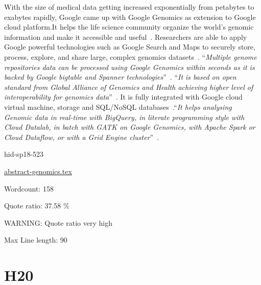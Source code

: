 With the size of medical data getting increased exponentially from 
petabytes to exabytes rapidly, Google came up with Google Genomics 
as extension to Google cloud platform.It helps the life science 
community organize the world’s genomic information and make it 
accessible and useful~\cite{hid-sp18-523-www-genomics}. 
Researchers are able to apply Google powerful technologies such as 
Google Search and Maps to securely store, process, explore, and share 
large, complex genomics datasets~\cite{hid-sp18-523-www-genomics}.
\color{blue}``\emph{Multiple genome repositories data can be processed using Google 
Genomics within seconds as it is backed by Google bigtable and 
Spanner technologies}''\color{black}~\cite{hid-sp18-523-www-genomics}. 
\color{blue}``\emph{It is based on open standard from Global Alliance of Genomics and 
Health achieving higher level of interoperability for genomics 
data}''\color{black}~\cite{hid-sp18-523-www-genomics}. It is fully integrated with 
Google cloud virtual machine, storage and SQL/NoSQL 
databases~\cite{hid-sp18-523-www-genomics}.\color{blue}``\emph{It helps analysing Genomic 
data in real-time with BigQuery, in literate programming style 
with Cloud Datalab, in batch with GATK on Google Genomics, with 
Apache Spark or Cloud Dataflow, or with a Grid Engine 
cluster}''\color{black}~\cite{hid-sp18-523-www-genomics}.


\begin{IU}

hid-sp18-523

\href{https://github.com/cloudmesh-community/hid-sp18-523/blob/master//technology/abstract-genomics.tex}{abstract-genomics.tex}

 

Wordcount: 158


Quote ratio: 37.58 \%

WARNING: Quote ratio very high
 
Max Line length: 90
\end{IU}

\section{H20}


